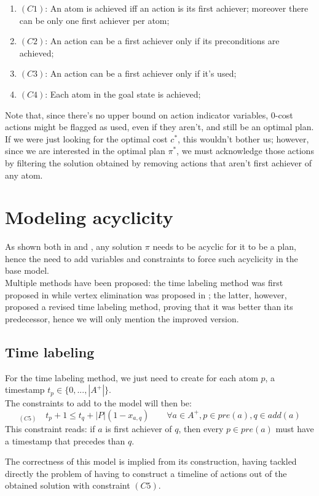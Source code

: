 \begin{enumerate}
    \item[]$(C1)$: An atom is achieved iff an action is its first achiever; moreover there can be only one first achiever per atom;
    \item[]$(C2)$: An action can be a first achiever only if its preconditions are achieved;
    \item[]$(C3)$: An action can be a first achiever only if it's used;
    \item[]$(C4)$: Each atom in the goal state is achieved;
\end{enumerate}
Note that, since there's no upper bound on action indicator variables, 0-cost actions might be flagged as used, even if they aren't, and still be an optimal plan.\\
If we were just looking for the optimal cost $c^*$, this wouldn't bother us; however, since we are interested in the optimal plan $\pi^*$, we must acknowledge those actions by filtering the solution obtained by removing actions that aren't first achiever of any atom.

\section{Modeling acyclicity}
As shown both in \cite{Imai_15} and \cite{Rankooh_22}, any solution $\pi$ needs to be acyclic for it to be a plan, hence the need to add variables and constraints to force such acyclicity in the base model.\\
Multiple methods have been proposed: the time labeling method was first proposed in \cite{Imai_15} while vertex elimination was proposed in \cite{Rankooh_22}; the latter, however, proposed a revised time labeling method, proving that it was better than its predecessor, hence we will only mention the improved version.

\subsection{Time labeling}
For the time labeling method, we just need to create for each atom $p$, a timestamp $t_p\in\{0,...,|A^+|\}$.\\
The constraints to add to the model will then be:
$$_{(C5)}\quad t_p + 1 \leq t_q + |P|(1-x_{a, q})\qquad\forall a\in A^+,p\in pre(a),q\in add(a)$$
This constraint reads: if $a$ is first achiever of $q$, then every $p\in pre(a)$ must have a timestamp that precedes than $q$.

The correctness of this model is implied from its construction, having tackled directly the problem of having to construct a timeline of actions out of the obtained solution with constraint ${(C5)}$.

